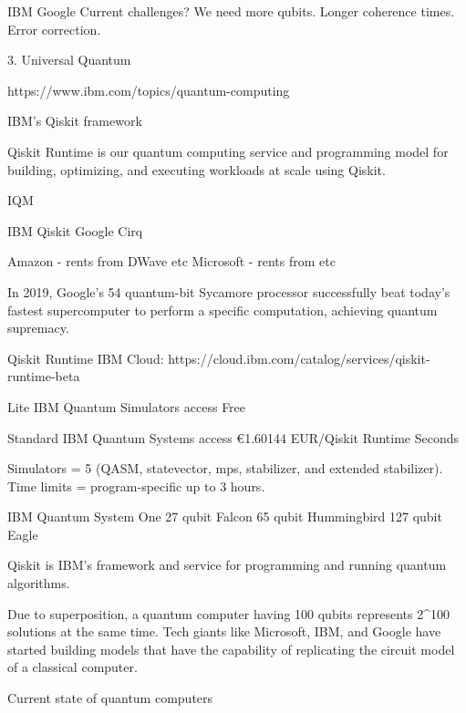 IBM
Google
Current challenges?
We need more qubits.
Longer coherence times.
Error correction.

3. Universal Quantum

https://www.ibm.com/topics/quantum-computing

IBM's Qiskit framework

Qiskit Runtime is our quantum computing service and programming model for building, optimizing, and executing workloads at scale using Qiskit.

IQM

IBM Qiskit
Google Cirq

Amazon - rents from DWave etc
Microsoft - rents from etc

In 2019, Google's 54 quantum-bit Sycamore processor successfully beat today's fastest supercomputer to perform a specific computation, achieving quantum supremacy.


Qiskit Runtime IBM Cloud:
https://cloud.ibm.com/catalog/services/qiskit-runtime-beta

Lite
	IBM Quantum Simulators access
	Free
	
Standard
	IBM Quantum Systems access
	€1.60144 EUR/Qiskit Runtime Seconds


Simulators = 5 (QASM, statevector, mps, stabilizer, and extended stabilizer). Time limits = program-specific up to 3 hours.




IBM Quantum System One
27 qubit Falcon
65 qubit Hummingbird
127 qubit Eagle

Qiskit is IBM's framework and service for programming and running quantum algorithms.


Due to superposition, a quantum computer having 100 qubits represents 2^100 solutions at the same time. Tech giants like Microsoft, IBM, and Google have started building models that have the capability of replicating the circuit model of a classical computer.

Current state of quantum computers



